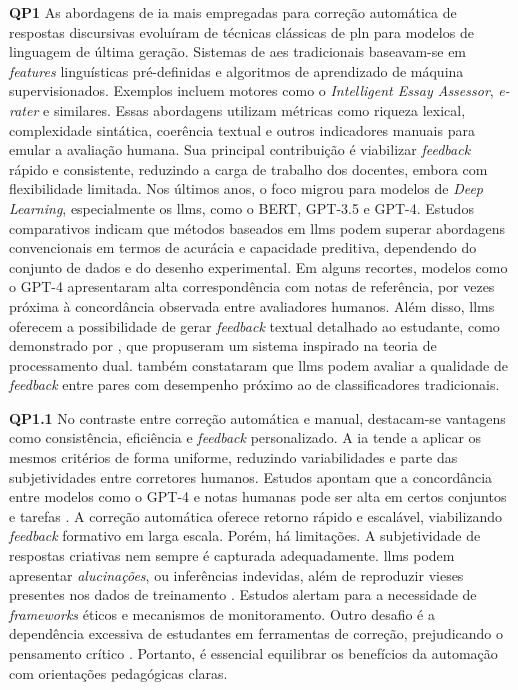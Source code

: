 \textbf{QP1}
As abordagens de \gls{ia} mais empregadas para correção automática de respostas discursivas evoluíram de técnicas clássicas de \gls{pln} para modelos de linguagem de última geração. Sistemas de \gls{aes} tradicionais baseavam-se em \textit{features} linguísticas pré-definidas e algoritmos de aprendizado de máquina supervisionados. Exemplos incluem motores como o \textit{Intelligent Essay Assessor}, \textit{e-rater} e similares. Essas abordagens utilizam métricas como riqueza lexical, complexidade sintática, coerência textual e outros indicadores manuais para emular a avaliação humana. Sua principal contribuição é viabilizar \textit{feedback} rápido e consistente, reduzindo a carga de trabalho dos docentes, embora com flexibilidade limitada. Nos últimos anos, o foco migrou para modelos de \textit{Deep Learning}, especialmente os \gls{llm}s, como o BERT, GPT-3.5 e GPT-4. Estudos comparativos indicam que métodos baseados em \gls{llm}s podem superar abordagens convencionais em termos de acurácia e capacidade preditiva, dependendo do conjunto de dados e do desenho experimental. Em alguns recortes, modelos como o GPT-4 apresentaram alta correspondência com notas de referência, por vezes próxima à concordância observada entre avaliadores humanos. Além disso, \gls{llm}s oferecem a possibilidade de gerar \textit{feedback} textual detalhado ao estudante, como demonstrado por , que propuseram um sistema inspirado na teoria de processamento dual.  também constataram que \gls{llm}s podem avaliar a qualidade de \textit{feedback} entre pares com desempenho próximo ao de classificadores tradicionais.

\textbf{QP1.1}
No contraste entre correção automática e manual, destacam-se vantagens como consistência, eficiência e \textit{feedback} personalizado. A \gls{ia} tende a aplicar os mesmos critérios de forma uniforme, reduzindo variabilidades e parte das subjetividades entre corretores humanos. Estudos apontam que a concordância entre modelos como o GPT-4 e notas humanas pode ser alta em certos conjuntos e tarefas \cite{li_applying_2024}. A correção automática oferece retorno rápido e escalável, viabilizando \textit{feedback} formativo em larga escala. Porém, há limitações. A subjetividade de respostas criativas nem sempre é capturada adequadamente. \gls{llm}s podem apresentar \textit{alucinações}, ou inferências indevidas, além de reproduzir vieses presentes nos dados de treinamento \cite{xiao_human-ai_2025}. Estudos alertam para a necessidade de \textit{frameworks} éticos e mecanismos de monitoramento. Outro desafio é a dependência excessiva de estudantes em ferramentas de correção, prejudicando o pensamento crítico \cite{fiki_setiawan_exploring_2025}. Portanto, é essencial equilibrar os benefícios da automação com orientações pedagógicas claras.

